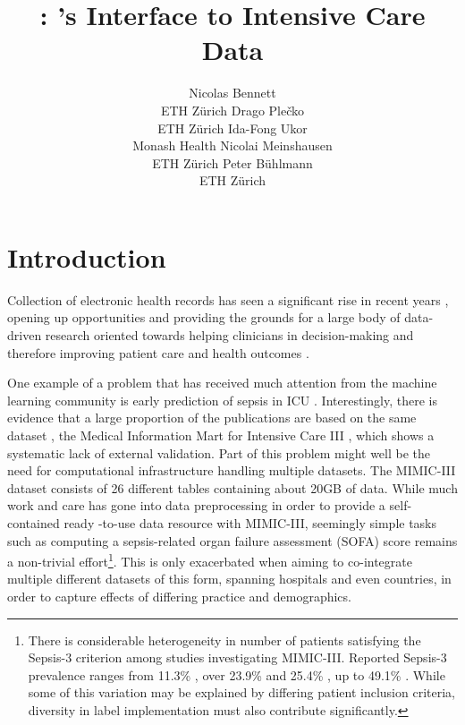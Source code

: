 \documentclass[
  notitle]{jss}
\author{
Nicolas Bennett\footnotemark[1]\\ETH Zürich \And Drago
Plečko\footnotemark[1]\footnotetext[1]{These authors contributed equally.}\\ETH Zürich \And Ida-Fong Ukor\\Monash Health \AND Nicolai Meinshausen\\ETH Zürich \And Peter Bühlmann\\ETH Zürich
}
\title{\pkg{ricu}: \proglang{R}'s Interface to Intensive Care Data}
\begin{document}
\maketitle

\renewcommand*{\thefootnote}{\fnsymbol{footnote}}
\renewcommand*{\thefootnote}{\arabic{footnote}}

\hypertarget{introduction}{%
\section{Introduction}\label{introduction}}

Collection of electronic health records has seen a significant rise in
recent years \citep{evans2016}, opening up opportunities and providing
the grounds for a large body of data-driven research oriented towards
helping clinicians in decision-making and therefore improving patient
care and health outcomes \citep{jiang2017}.

One example of a problem that has received much attention from the
machine learning community is early prediction of sepsis in ICU
\citep{desautels2016, nemati2018, futoma2017, kam2017}. Interestingly,
there is evidence that a large proportion of the publications are based
on the same dataset \citep{fleuren2019}, the Medical Information Mart
for Intensive Care III \citep[MIMIC-III;][]{johnson2016}, which shows a
systematic lack of external validation. Part of this problem might well
be the need for computational infrastructure handling multiple datasets.
The MIMIC-III dataset consists of 26 different tables containing about
20GB of data. While much work and care has gone into data preprocessing
in order to provide a self-contained ready -to-use data resource with
MIMIC-III, seemingly simple tasks such as computing a sepsis-related
organ failure assessment (SOFA) score \citep{vincent1996} remains a
non-trivial effort\footnote{There is considerable heterogeneity in
  number of patients satisfying the Sepsis-3 criterion
  \citep[of which SOFA provides a major component;][]{singer2016} among
  studies investigating MIMIC-III. Reported Sepsis-3 prevalence ranges
  from 11.3\% \citep{desautels2016}, over 23.9\% \citep{nemati2018} and
  25.4\% \citep{wang2018}, up to 49.1\% \citep{johnson2018}. While some
  of this variation may be explained by differing patient inclusion
  criteria, diversity in label implementation must also contribute
  significantly.}. This is only exacerbated when aiming to co-integrate
multiple different datasets of this form, spanning hospitals and even
countries, in order to capture effects of differing practice and
demographics.
\end{document}
